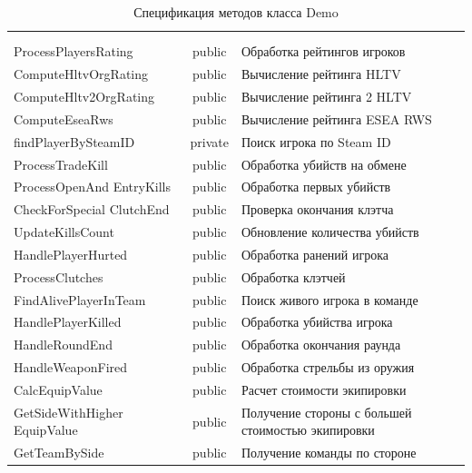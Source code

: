\begin{xltabular}{\textwidth}{|X|c|X|}
	\caption{Спецификация методов класса Demo}\label{table:DemoMethods}\\ \hline
	 &  &  \\ \hline
	 &  &  \\ \hline
	\endfirsthead
	 \hline
	 &  &  \\ \hline
	\endhead
	ProcessPlayersRating & public & Обработка рейтингов игроков \\ \hline
	ComputeHltvOrgRating & public & Вычисление рейтинга HLTV \\ \hline
	ComputeHltv2OrgRating & public & Вычисление рейтинга 2 HLTV \\ \hline
	ComputeEseaRws & public & Вычисление рейтинга ESEA RWS \\ \hline
	findPlayerBySteamID & private & Поиск игрока по Steam ID \\ \hline
	ProcessTradeKill & public & Обработка убийств на обмене \\ \hline
	ProcessOpenAnd
	EntryKills & public & Обработка первых убийств \\ \hline
	CheckForSpecial
	ClutchEnd & public & Проверка окончания клэтча \\ \hline
	UpdateKillsCount & public & Обновление количества убийств \\ \hline
	HandlePlayerHurted & public & Обработка ранений игрока \\ \hline
	ProcessClutches & public & Обработка клэтчей \\ \hline
	FindAlivePlayerInTeam & public & Поиск живого игрока в команде \\ \hline
	HandlePlayerKilled & public & Обработка убийства игрока \\ \hline
	HandleRoundEnd & public & Обработка окончания раунда \\ \hline
	HandleWeaponFired & public & Обработка стрельбы из оружия \\ \hline
	CalcEquipValue & public & Расчет стоимости экипировки \\ \hline
	GetSideWithHigher
	EquipValue & public & Получение стороны с большей стоимостью экипировки \\ \hline
	GetTeamBySide & public & Получение команды по стороне \\ \hline
\end{xltabular}

